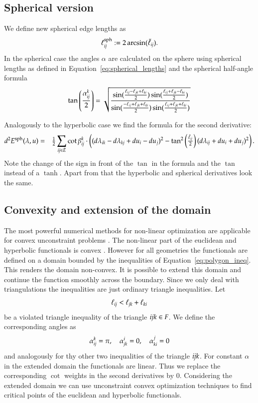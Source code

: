 \documentclass[Thesis]{subfiles}
\begin{document}
\subsection{Spherical version}
\label{sec:spherical_fuctional}
We define new spherical edge lengths as 
\begin{equation}
\ell^{\rm sph}_{\it ij} := 2\arcsin(\tilde \ell_{\it ij}).\label{eq:spherical_lengths}
\end{equation}
In the spherical case the angles $\alpha$ are calculated on the sphere using spherical lengths as defined in 
Equation~\ref{eq:spherical_lengths} and the spherical half-angle formula
\[
  \tan\left(\frac{\alpha^k_{\it ij}}{2}\right)=
  \sqrt{\frac{
      \sin(\frac{\ell_{ij}-\ell_{jk}+\ell_{ki}}{2})
      \sin(\frac{\ell_{ij}+\ell_{jk}-\ell_{ki}}{2})
    }{
      \sin(\frac{-\ell_{ij}+\ell_{jk}+\ell_{ki}}{2})
      \sin(\frac{\ell_{ij}+\ell_{jk}+\ell_{ki}}{2})
    }}
\]

Analogously to the hyperbolic case we find the formula for the second derivative:
\begin{eqnarray*}
d^2E^{\rm sph}(\lambda, u)
&=& \tfrac{1}{2}\sum_{\it ij\in \bar{E}} \cot\beta^k_{\it ij} \cdot 
 \left((d\lambda_{\it ik}-d\lambda_{\it kj} +  du_i-du_j)^2-\tan^2\left(\tfrac{\tilde \ell_{\it ij}}{2}\right)(d\lambda_{\it ij} +du_i+du_j)^2\right).
\end{eqnarray*}
Note the change of the sign in front of the $\tan$ in the formula and the $\tan$ instead of a $\tanh$. 
Apart from that the hyperbolic and spherical derivatives look the same.

\subsection{Convexity and extension of the domain}

The most powerful numerical methods for non-linear optimization are applicable for convex unconstraint problems \cite{boyd2004convex}.
The non-linear part of the euclidean and hyperbolic functionals is convex \cite{Bobenko2010}. 
However for all geometries the functionals are defined on a domain bounded by the inequalities of Equation~\ref{eq:polygon_ineq}.
This renders the domain non-convex. 
It is possible to extend this domain and continue the function smoothly across the boundary.
Since we only deal with triangulations the inequalities are just ordinary triangle inequalities. 
Let 
\[\ell_{\it ij} < \ell_{\it jk} + \ell_{\it ki}\] 
be a violated triangle inequality of the triangle $\it ijk \in F$. We define the corresponding angles as
\begin{equation*}
\alpha^k_{\it ij} = \pi,\quad \alpha^i_{\it jk} = 0,\quad \alpha^j_{\it ki} = 0
\end{equation*}
and analogously for thy other two inequalities of the triangle $\it ijk$. 
For constant $\alpha$ in the extended domain the functionals are linear.
Thus we replace the corresponding $\cot$ weights in the second derivatives by $0$.
Considering the extended domain we can use unconstraint convex optimization techniques to find critical points of the euclidean and hyperbolic functionals.
\end{document}
